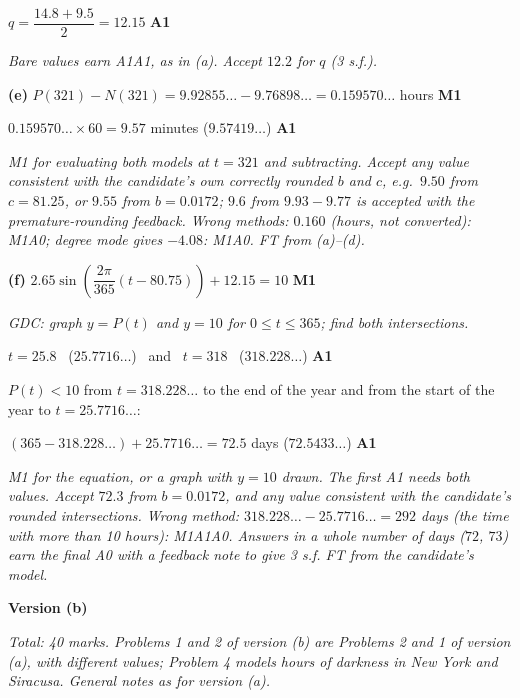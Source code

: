 \documentclass[12pt, twoside]{article}
\begin{document}
\begin{enumerate}[itemsep=0.3cm]
$q = \dfrac{14.8 + 9.5}{2} = 12.15$ \hfill \textbf{A1}

\emph{Bare values earn A1A1, as in (a). Accept $12.2$ for $q$ (3 s.f.).}

\textbf{(e)} $P(321) - N(321) = 9.92855\ldots - 9.76898\ldots = 0.159570\ldots$
hours \hfill \textbf{M1}

$0.159570\ldots \times 60 = 9.57$ minutes \quad ($9.57419\ldots$)
\hfill \textbf{A1}

\emph{M1 for evaluating both models at $t = 321$ and subtracting. Accept any
value consistent with the candidate's own correctly rounded $b$ and $c$,
e.g.\ $9.50$ from $c = 81.25$, or $9.55$ from $b = 0.0172$; $9.6$ from
$9.93 - 9.77$ is accepted with the premature-rounding feedback. Wrong
methods: $0.160$ (hours, not converted): M1A0; degree mode gives
$-4.08$: M1A0. FT from (a)--(d).}

\newpage

\textbf{(f)} $2.65\sin\!\left(\dfrac{2\pi}{365}(t - 80.75)\right) + 12.15 = 10$
\hfill \textbf{M1}

\textit{GDC: graph $y = P(t)$ and $y = 10$ for $0 \le t \le 365$; find both
intersections.}

$t = 25.8$ \ ($25.7716\ldots$) \ and \ $t = 318$ \ ($318.228\ldots$)
\hfill \textbf{A1}

$P(t) < 10$ from $t = 318.228\ldots$ to the end of the year and from the
start of the year to $t = 25.7716\ldots$:

$(365 - 318.228\ldots) + 25.7716\ldots = 72.5$ days \quad ($72.5433\ldots$)
\hfill \textbf{A1}

\emph{M1 for the equation, or a graph with $y = 10$ drawn. The first A1
needs both values. Accept $72.3$ from $b = 0.0172$, and any value
consistent with the candidate's rounded intersections. Wrong method:
$318.228\ldots - 25.7716\ldots = 292$ days (the time with \emph{more} than
10 hours): M1A1A0. Answers in a whole number of days ($72$, $73$) earn the
final A0 with a feedback note to give 3 s.f. FT from the candidate's
model.}

\end{enumerate}

\newpage

\textbf{\large Version (b)}

\emph{Total: 40 marks. Problems 1 and 2 of version (b) are Problems 2 and 1
of version (a), with different values; Problem 4 models hours of darkness
in New York and Siracusa. General notes as for version (a).}
\end{document}
